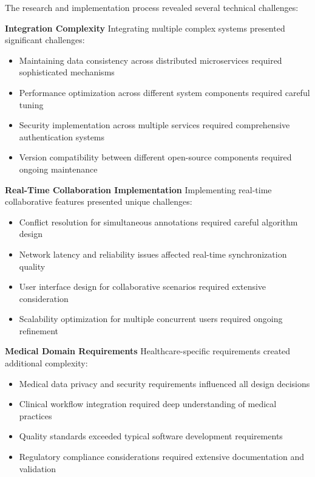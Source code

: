 The research and implementation process revealed several technical challenges:

\textbf{Integration Complexity}
Integrating multiple complex systems presented significant challenges:

\begin{itemize}
    \item Maintaining data consistency across distributed microservices required sophisticated mechanisms
    \item Performance optimization across different system components required careful tuning
    \item Security implementation across multiple services required comprehensive authentication systems
    \item Version compatibility between different open-source components required ongoing maintenance
\end{itemize}

\textbf{Real-Time Collaboration Implementation}
Implementing real-time collaborative features presented unique challenges:

\begin{itemize}
    \item Conflict resolution for simultaneous annotations required careful algorithm design
    \item Network latency and reliability issues affected real-time synchronization quality
    \item User interface design for collaborative scenarios required extensive consideration
    \item Scalability optimization for multiple concurrent users required ongoing refinement
\end{itemize}

\textbf{Medical Domain Requirements}
Healthcare-specific requirements created additional complexity:

\begin{itemize}
    \item Medical data privacy and security requirements influenced all design decisions
    \item Clinical workflow integration required deep understanding of medical practices
    \item Quality standards exceeded typical software development requirements
    \item Regulatory compliance considerations required extensive documentation and validation
\end{itemize}

